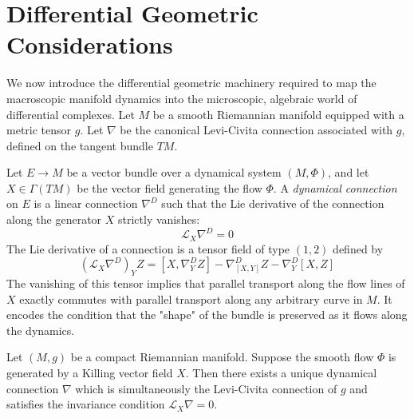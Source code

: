 \section{Differential Geometric Considerations}
\label{sec:diff_geo}

We now introduce the differential geometric machinery required to map the macroscopic manifold dynamics into the microscopic, algebraic world of differential complexes. Let $M$ be a smooth Riemannian manifold equipped with a metric tensor $g$. Let $\nabla$ be the canonical Levi-Civita connection associated with $g$, defined on the tangent bundle $TM$.

\begin{definition}
\label{def:dyn_conn}
Let $E \to M$ be a vector bundle over a dynamical system $(M, \Phi)$, and let $X \in \Gamma(TM)$ be the vector field generating the flow $\Phi$. A \emph{dynamical connection} on $E$ is a linear connection $\nabla^D$ such that the Lie derivative of the connection along the generator $X$ strictly vanishes:
\[ \mathcal{L}_X \nabla^D = 0 \]
The Lie derivative of a connection is a tensor field of type $(1,2)$ defined by
\[ (\mathcal{L}_X \nabla^D)_Y Z = [X, \nabla^D_Y Z] - \nabla^D_{[X,Y]} Z - \nabla^D_Y [X, Z] \]
The vanishing of this tensor implies that parallel transport along the flow lines of $X$ exactly commutes with parallel transport along any arbitrary curve in $M$. It encodes the condition that the "shape" of the bundle is preserved as it flows along the dynamics.
\end{definition}

\begin{theorem}
\label{thm:inv_conn}
Let $(M, g)$ be a compact Riemannian manifold. Suppose the smooth flow $\Phi$ is generated by a Killing vector field $X$. Then there exists a unique dynamical connection $\nabla$ which is simultaneously the Levi-Civita connection of $g$ and satisfies the invariance condition $\mathcal{L}_X \nabla = 0$.
\end{theorem}

